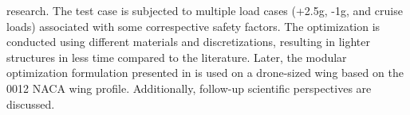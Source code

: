 research. The test case is subjected to multiple load cases (+2.5g, -1g, and cruise loads) associated with some correspective safety factors. The optimization is conducted using different materials and discretizations, resulting in lighter structures in less time compared to the literature. Later, the modular optimization formulation presented in  is used on a drone-sized wing based on the 0012 NACA wing profile. Additionally, follow-up scientific perspectives are discussed.